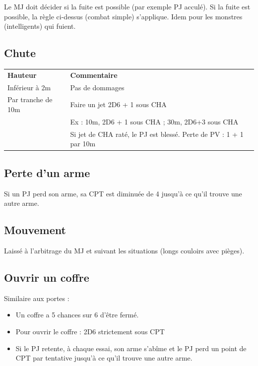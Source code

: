 \documentclass[a4paper, 11pt, twoside]{article}
\begin{document}
Le MJ doit décider si la fuite est possible (par exemple PJ acculé). Si la fuite est possible, la règle ci-dessus (combat simple) s'applique. Idem pour les monstres (intelligents) qui fuient.

\subsection{Chute}
\label{sec:org34c4c18}

\begin{longtable}{ll}
\textbf{Hauteur} & \textbf{Commentaire}\\
Inférieur à 2m & Pas de dommages\\
Par tranche de 10m & Faire un jet 2D6 + 1 sous CHA\\
 & Ex : 10m, 2D6 + 1 sous CHA ; 30m, 2D6+3 sous CHA\\
 & Si jet de CHA raté, le PJ est blessé. Perte de PV : 1 + 1 par 10m\\
\end{longtable}

\subsection{Perte d'un arme}
\label{sec:org4203fd3}

Si un PJ perd son arme, sa CPT est diminuée de 4 jusqu'à ce qu'il trouve une autre arme.

\subsection{Mouvement}
\label{sec:org343ae5c}

Laissé à l'arbitrage du MJ et suivant les situations (longs couloirs avec pièges).

\subsection{Ouvrir un coffre}
\label{sec:org04b9e80}

Similaire aux portes :
\begin{itemize}
\item Un coffre a 5 chances sur 6 d'être fermé.
\item Pour ouvrir le coffre : 2D6 strictement sous CPT
\item Si le PJ retente, à chaque essai, son arme s'abîme et le PJ perd un point de CPT par tentative jusqu'à ce qu'il trouve une autre arme.
\end{itemize}
\end{document}
